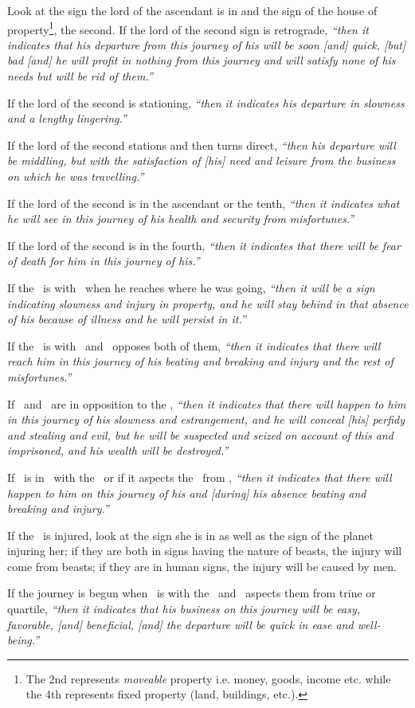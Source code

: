 Look at the sign the lord of the ascendant is in and the sign of the house of property\footnote{The 2nd represents \textsl{moveable} property i.e. money, goods, income etc. while the 4th represents fixed property (land, buildings, etc.).}, the second. If the lord of the second sign is retrograde, \textsl{``then it indicates that his departure from this journey of his will be soon [and] quick, [but] bad [and] he will profit in nothing from this journey and will satisfy none of his needs but will be rid of them.''}

If the lord of the second is stationing, \textsl{``then it indicates his departure in slowness and a lengthy lingering.''}

If the lord of the second stations and then turns direct, \textsl{``then his departure will be middling, but with the satisfaction of [his] need and leisure from the business on which he was travelling.''}

If the lord of the second is in the ascendant or the tenth, \textsl{``then it indicates what he will see in this journey of his health and security from misfortunes.''}

If the lord of the second is in the fourth, \textsl{``then it indicates that there will be fear of death for him in this journey of his.''}

If the \Moon\, is with \Saturn\, when he reaches where he was going, \textsl{``then it will be a sign indicating slowness and injury in property, and he will stay behind in that absence of his because of illness and he will persist in it.''}

If the \Moon\, is with \Mercury\, and \Mars\, opposes both of them, \textsl{``then it indicates that there will reach him in this journey of his beating and breaking and injury and the rest of misfortunes.''}

If \Mercury\, and \Saturn\, are in opposition to the \Moon, \textsl{``then it indicates that there will happen to him in this journey of his slowness and estrangement, and he will conceal [his] perfidy and stealing and evil, but he will be suspected and seized on account of this and imprisoned, and his wealth will be destroyed.''}

If \Mars\, is in \Sagittarius\, with the \Moon\, or if it aspects the \Moon\, from \Sagittarius, \textsl{``then it indicates that there will happen to him on this journey of his and [during] his absence beating and breaking and injury.''}

If the \Moon\, is injured, look at the sign she is in as well as the sign of the planet injuring her; if they are both in signs having the nature of beasts, the injury will come from beasts; if they are in human signs, the injury will be caused by men.

If the journey is begun when \Mercury\, is with the \Moon\, and \Jupiter\, aspects them from trine or quartile, \textsl{``then it indicates that his business on this journey will be easy, favorable, [and] beneficial, [and] the departure will be quick in ease and well-being.''}






